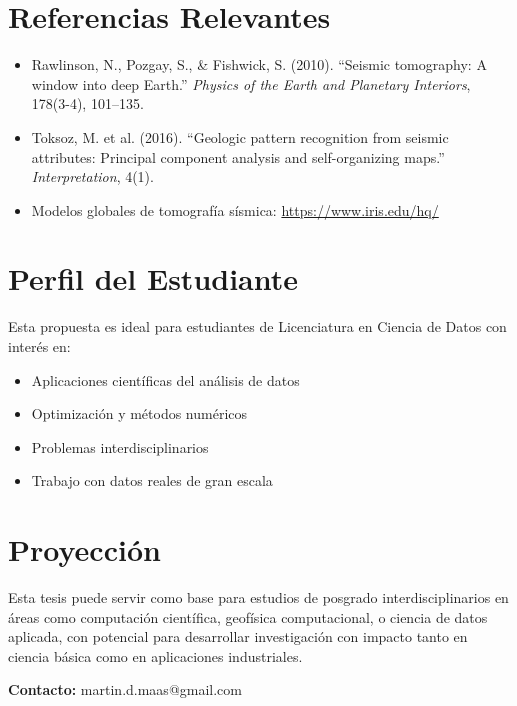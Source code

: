 \documentclass[11pt,a4paper]{article}
\begin{document}
\section*{Referencias Relevantes}

\begin{itemize}[leftmargin=*]
    \item Rawlinson, N., Pozgay, S., \& Fishwick, S. (2010). ``Seismic tomography: A window into deep Earth.'' \emph{Physics of the Earth and Planetary Interiors}, 178(3-4), 101--135.
    
    \item Toksoz, M. et al. (2016). ``Geologic pattern recognition from seismic attributes: Principal component analysis and self-organizing maps.'' \emph{Interpretation}, 4(1).
    
    \item Modelos globales de tomografía sísmica: \url{https://www.iris.edu/hq/}
\end{itemize}

\section*{Perfil del Estudiante}

Esta propuesta es ideal para estudiantes de Licenciatura en Ciencia de Datos con interés en:
\begin{itemize}[leftmargin=*]
    \item Aplicaciones científicas del análisis de datos
    \item Optimización y métodos numéricos
    \item Problemas interdisciplinarios
    \item Trabajo con datos reales de gran escala
\end{itemize}

\section*{Proyección}

Esta tesis puede servir como base para estudios de posgrado interdisciplinarios en áreas como computación científica, geofísica computacional, o ciencia de datos aplicada, con potencial para desarrollar investigación con impacto tanto en ciencia básica como en aplicaciones industriales.

\vspace{1cm}

\noindent\textbf{Contacto:} martin.d.maas@gmail.com
\end{document}
